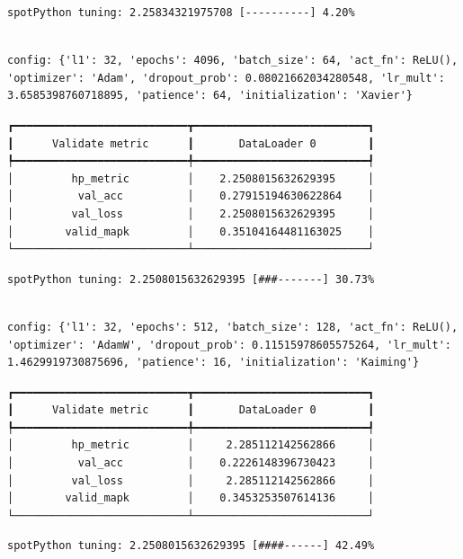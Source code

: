 \documentclass[
  letterpaper,
  DIV=11,
  numbers=noendperiod]{scrreprt}
\begin{document}
\begin{verbatim}
spotPython tuning: 2.25834321975708 [----------] 4.20% 
\end{verbatim}

\begin{verbatim}

config: {'l1': 32, 'epochs': 4096, 'batch_size': 64, 'act_fn': ReLU(), 'optimizer': 'Adam', 'dropout_prob': 0.08021662034280548, 'lr_mult': 3.6585398760718895, 'patience': 64, 'initialization': 'Xavier'}
\end{verbatim}

\begin{verbatim}
┏━━━━━━━━━━━━━━━━━━━━━━━━━━━┳━━━━━━━━━━━━━━━━━━━━━━━━━━━┓
┃      Validate metric      ┃       DataLoader 0        ┃
┡━━━━━━━━━━━━━━━━━━━━━━━━━━━╇━━━━━━━━━━━━━━━━━━━━━━━━━━━┩
│         hp_metric         │    2.2508015632629395     │
│          val_acc          │    0.27915194630622864    │
│         val_loss          │    2.2508015632629395     │
│        valid_mapk         │    0.35104164481163025    │
└───────────────────────────┴───────────────────────────┘
\end{verbatim}

\begin{verbatim}
spotPython tuning: 2.2508015632629395 [###-------] 30.73% 
\end{verbatim}

\begin{verbatim}

config: {'l1': 32, 'epochs': 512, 'batch_size': 128, 'act_fn': ReLU(), 'optimizer': 'AdamW', 'dropout_prob': 0.11515978605575264, 'lr_mult': 1.4629919730875696, 'patience': 16, 'initialization': 'Kaiming'}
\end{verbatim}

\begin{verbatim}
┏━━━━━━━━━━━━━━━━━━━━━━━━━━━┳━━━━━━━━━━━━━━━━━━━━━━━━━━━┓
┃      Validate metric      ┃       DataLoader 0        ┃
┡━━━━━━━━━━━━━━━━━━━━━━━━━━━╇━━━━━━━━━━━━━━━━━━━━━━━━━━━┩
│         hp_metric         │     2.285112142562866     │
│          val_acc          │    0.2226148396730423     │
│         val_loss          │     2.285112142562866     │
│        valid_mapk         │    0.3453253507614136     │
└───────────────────────────┴───────────────────────────┘
\end{verbatim}

\begin{verbatim}
spotPython tuning: 2.2508015632629395 [####------] 42.49% 
\end{verbatim}
\end{document}
